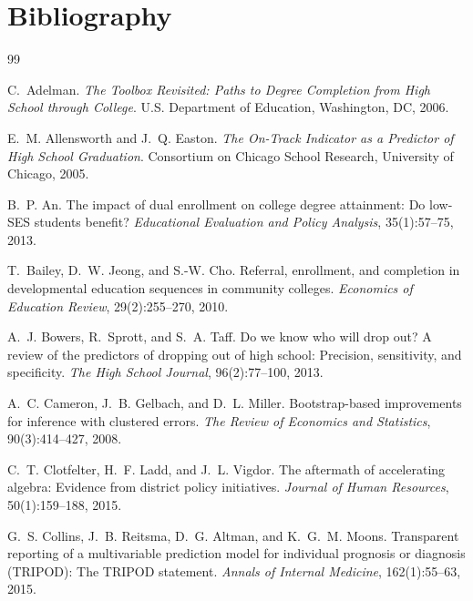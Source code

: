 \documentclass[11pt]{article}
\begin{document}
\section*{Bibliography}
\begingroup\small
\renewcommand{\section}[2]{}
\begin{thebibliography}{99}
\setlength{\itemsep}{0.55ex}

 C.~Adelman. \emph{The Toolbox Revisited: Paths to Degree Completion from High School through College}. U.S. Department of Education, Washington, DC, 2006.

 E.~M. Allensworth and J.~Q. Easton. \emph{The On-Track Indicator as a Predictor of High School Graduation}. Consortium on Chicago School Research, University of Chicago, 2005.

 B.~P. An. The impact of dual enrollment on college degree attainment: Do low-SES students benefit? \emph{Educational Evaluation and Policy Analysis}, 35(1):57--75, 2013.

 T.~Bailey, D.~W. Jeong, and S.-W. Cho. Referral, enrollment, and completion in developmental education sequences in community colleges. \emph{Economics of Education Review}, 29(2):255--270, 2010.

 A.~J. Bowers, R.~Sprott, and S.~A. Taff. Do we know who will drop out? A review of the predictors of dropping out of high school: Precision, sensitivity, and specificity. \emph{The High School Journal}, 96(2):77--100, 2013.

 A.~C. Cameron, J.~B. Gelbach, and D.~L. Miller. Bootstrap-based improvements for inference with clustered errors. \emph{The Review of Economics and Statistics}, 90(3):414--427, 2008.

 C.~T. Clotfelter, H.~F. Ladd, and J.~L. Vigdor. The aftermath of accelerating algebra: Evidence from district policy initiatives. \emph{Journal of Human Resources}, 50(1):159--188, 2015.

 G.~S. Collins, J.~B. Reitsma, D.~G. Altman, and K.~G.~M. Moons. Transparent reporting of a multivariable prediction model for individual prognosis or diagnosis (TRIPOD): The TRIPOD statement. \emph{Annals of Internal Medicine}, 162(1):55--63, 2015.


\end{thebibliography}
\end{document}

